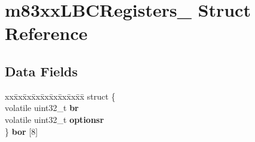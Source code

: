 \hypertarget{structm83xxLBCRegisters__}{}\section{m83xx\+L\+B\+C\+Registers\+\_\+ Struct Reference}
\label{structm83xxLBCRegisters__}
\subsection*{Data Fields}
\begin{DoxyCompactItemize}
\item 
\mbox{\label{structm83xxLBCRegisters___ad3cd82bbea47f57640783e2f3129061b}} 
\begin{tabbing}
xx\=xx\=xx\=xx\=xx\=xx\=xx\=xx\=xx\=\kill
struct \{\\
\>volatile uint32\_t {\bfseries br}\\
\>volatile uint32\_t {\bfseries optionsr}\\
\} {\bfseries bor} \mbox{[}8\mbox{]}\\


\end{tabbing}
\end{DoxyCompactItemize}
